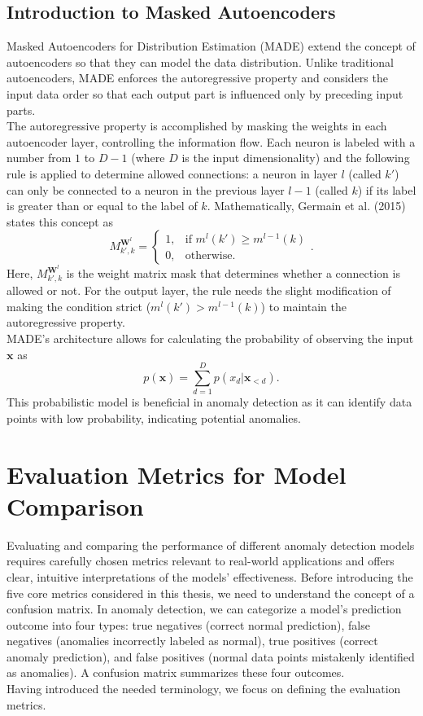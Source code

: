 \subsection{Introduction to Masked Autoencoders}
\label{theory:made}
Masked Autoencoders for Distribution Estimation (MADE) extend the concept of autoencoders so that they can model the data distribution. Unlike traditional autoencoders, MADE enforces the autoregressive property and considers the input data order so that each output part is influenced only by preceding input parts.\\
The autoregressive property is accomplished by masking the weights in each autoencoder layer, controlling the information flow. Each neuron is labeled with a number from $1$ to $D-1$ (where $D$ is the input dimensionality) and the following rule is applied to determine allowed connections: a neuron in layer $l$ (called $k'$) can only be connected to a neuron in the previous layer $l-1$ (called $k$) if its label is greater than or equal to the label of $k$. Mathematically, Germain et al. (2015) states this concept as
\[ M^{\mathbf{W}^l}_{k',k}=\begin{cases}
    1, & \text{if } m^l(k')\geq m^{l-1}(k) \\
    0, & \text{otherwise.}
  \end{cases} .\]
Here, $M^{\mathbf{W}^l}_{k',k}$ is the weight matrix mask that determines whether a connection is allowed or not. For the output layer, the rule needs the slight modification of making the condition strict ($m^l(k')> m^{l-1}(k)$) to maintain the autoregressive property.\\
MADE's architecture allows for calculating the probability of observing the input $\mathbf{x}$ as
\[ p(\mathbf{x}) = \sum_{d=1}^{D} p(x_d | \mathbf{x}_{<d}) .\]
This probabilistic model is beneficial in anomaly detection as it can identify data points with low probability, indicating potential anomalies.


\section{Evaluation Metrics for Model Comparison}
Evaluating and comparing the performance of different anomaly detection models requires carefully chosen metrics relevant to real-world applications and offers clear, intuitive interpretations of the models' effectiveness. Before introducing the five core metrics considered in this thesis, we need to understand the concept of a confusion matrix.
In anomaly detection, we can categorize a model's prediction outcome into four types: true negatives (correct normal prediction), false negatives (anomalies incorrectly labeled as normal), true positives (correct anomaly prediction), and false positives (normal data points mistakenly identified as anomalies). A confusion matrix summarizes these four outcomes.\\
Having introduced the needed terminology, we focus on defining the evaluation metrics.

